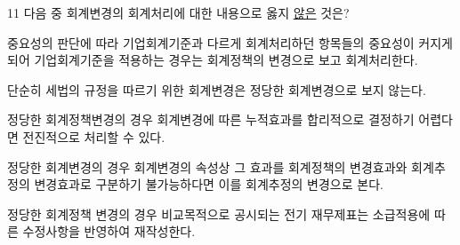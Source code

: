 \begin{question}{11}
다음 중 회계변경의 회계처리에 대한 내용으로 옳지 \uline{않은} 것은?
\begin{choices}
  \item 중요성의 판단에 따라 기업회계기준과 다르게 회계처리하던 항목들의 중요성이 커지게 되어 기업회계기준을 적용하는 경우는 회계정책의 변경으로 보고 회계처리한다.
  \item 단순히 세법의 규정을 따르기 위한 회계변경은 정당한 회계변경으로 보지 않는다.
  \item 정당한 회계정책변경의 경우 회계변경에 따른 누적효과를 합리적으로 결정하기 어렵다면 전진적으로 처리할 수 있다.
  \item 정당한 회계변경의 경우 회계변경의 속성상 그 효과를 회계정책의 변경효과와 회계추정의 변경효과로 구분하기 불가능하다면 이를 회계추정의 변경으로 본다.
  \item 정당한 회계정책 변경의 경우 비교목적으로 공시되는 전기 재무제표는 소급적용에 따른 수정사항을 반영하여 재작성한다.
\end{choices}
\end{question}
